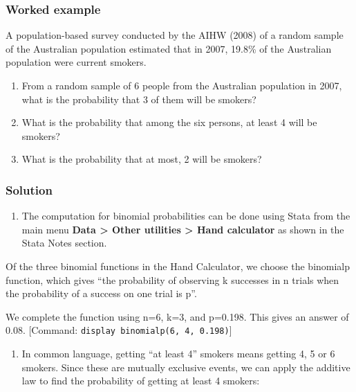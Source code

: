 \documentclass[
]{memoir}
\providecommand{\tightlist}{%
  \setlength{\itemsep}{0pt}\setlength{\parskip}{0pt}}
\begin{document}
\hypertarget{worked-example-2}{%
\subsubsection*{Worked example}\label{worked-example-2}}

A population-based survey conducted by the AIHW (2008) of a random sample of the Australian population estimated that in 2007, 19.8\% of the Australian population were current smokers.

\begin{enumerate}
\def\labelenumi{\alph{enumi})}
\tightlist
\item
  From a random sample of 6 people from the Australian population in 2007, what is the probability that 3 of them will be smokers?
\item
  What is the probability that among the six persons, at least 4 will be smokers?
\item
  What is the probability that at most, 2 will be smokers?
\end{enumerate}

\hypertarget{solution}{%
\subsubsection*{Solution}\label{solution}}

\begin{enumerate}
\def\labelenumi{\alph{enumi})}
\tightlist
\item
  The computation for binomial probabilities can be done using Stata from the main menu \textbf{Data \textgreater{} Other utilities \textgreater{} Hand calculator} as shown in the Stata Notes section.
\end{enumerate}

Of the three binomial functions in the Hand Calculator, we choose the binomialp function, which gives ``the probability of observing k successes in n trials when the probability of a success on one trial is p''.

We complete the function using n=6, k=3, and p=0.198. This gives an answer of 0.08.
{[}Command: \texttt{display\ binomialp(6,\ 4,\ 0.198)}{]}

\begin{enumerate}
\def\labelenumi{\alph{enumi})}
\setcounter{enumi}{1}
\tightlist
\item
  In common language, getting ``at least 4'' smokers means getting 4, 5 or 6 smokers. Since these are mutually exclusive events, we can apply the additive law to find the probability of getting at least 4 smokers:
\end{enumerate}
\end{document}
